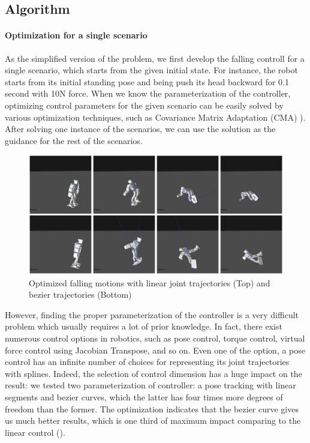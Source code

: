 \subsection{Algorithm}

\paragraph{Optimization for a single scenario}

As the simplified version of the problem, we first develop the falling
controll for a single scenario, which starts from the given initial 
state.
For instance, the robot starts from its initial standing pose and 
being push its head backward for 0.1 second with 10N force.
When we know the parameterization of the controller, optimizing
control parameters for the given scenario can be easily solved
by various optimization techniques, such as 
Covariance Matrix Adaptation (CMA) \cite{Hansen:2004:CMA}).
After solving one instance of the scenarios, we can use the solution
as the guidance for the rest of the scenarios.

\begin{figure}[htbp]
\center
  \includegraphics[width=\linewidth]{images/falling2_result}
  \caption{Optimized falling motions with linear joint trajectories (Top)
    and bezier trajectories (Bottom)}

 \label{fig:robotFalling}
\end{figure}

However, finding the proper parameterization of the controller
is a very difficult problem which usually requires a lot of prior knowledge.
In fact, there exist numerous control options in robotics, such as
pose control, torque control, virtual force control using Jacobian
Transpose, and so on.
Even one of the option, a pose control has an infinite number of choices for
representing its joint trajectories with splines.
Indeed, the selection of control dimension has a huge impact on the
result: we tested two parameterization of controller: a pose tracking 
with linear segments and bezier curves, which the latter has four times
more degrees of freedom than the former.
The optimization indicates that the bezier curve gives us 
much better results, which is one third of maximum impact
comparing to the linear control ().

